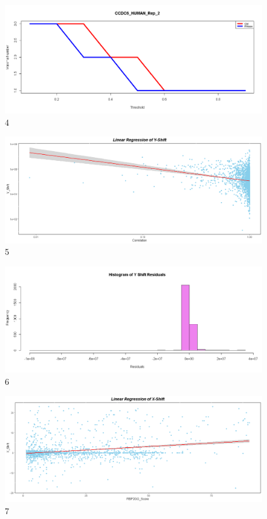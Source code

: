 \documentclass[
]{article}
\begin{document}
\begin{figure}
\centering
\includegraphics{../results/png/Maxnum_Plot.png}
\caption{4}
\end{figure}

\begin{figure}
\centering
\includegraphics{../results/png/Regression_Y.png}
\caption{5}
\end{figure}

\begin{figure}
\centering
\includegraphics{../results/png/Hist_Y.png}
\caption{6}
\end{figure}

\begin{figure}
\centering
\includegraphics{../results/png/Regression_X.png}
\caption{7}
\end{figure}
\end{document}
